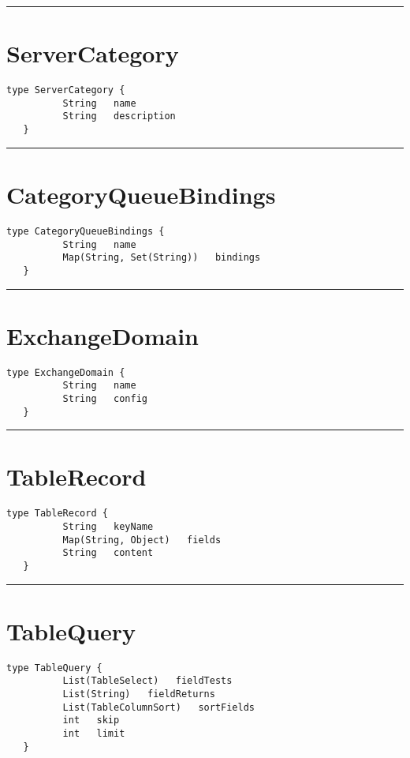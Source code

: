 \rule{12cm}{2pt}
\section{ServerCategory}
\label{type:ServerCategory}

\begin{lstlisting}[style=nonumbers]
   type ServerCategory {
          String   name
          String   description
   }
\end{lstlisting}

\rule{12cm}{2pt}
\section{CategoryQueueBindings}
\label{type:CategoryQueueBindings}

\begin{lstlisting}[style=nonumbers]
   type CategoryQueueBindings {
          String   name
          Map(String, Set(String))   bindings
   }
\end{lstlisting}

\rule{12cm}{2pt}
\section{ExchangeDomain}
\label{type:ExchangeDomain}

\begin{lstlisting}[style=nonumbers]
   type ExchangeDomain {
          String   name
          String   config
   }
\end{lstlisting}

\rule{12cm}{2pt}
\section{TableRecord}
\label{type:TableRecord}

\begin{lstlisting}[style=nonumbers]
   type TableRecord {
          String   keyName
          Map(String, Object)   fields
          String   content
   }
\end{lstlisting}

\rule{12cm}{2pt}
\section{TableQuery}
\label{type:TableQuery}

\begin{lstlisting}[style=nonumbers]
   type TableQuery {
          List(TableSelect)   fieldTests
          List(String)   fieldReturns
          List(TableColumnSort)   sortFields
          int   skip
          int   limit
   }
\end{lstlisting}


